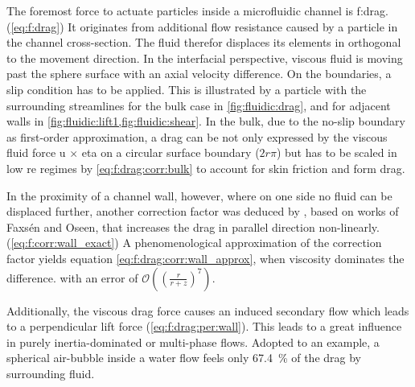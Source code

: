 The foremost force to actuate particles inside a microfluidic channel is \gls{f:drag}.(\cref{eq:f:drag}) It originates from additional flow resistance caused by a particle in the channel cross-section. The fluid therefor displaces its elements in orthogonal to the movement direction.\cite{lit:fluidic:motion_sphere_to_plane_surface}  In the interfacial perspective, viscous fluid is moving past the sphere surface with an axial velocity difference. On the boundaries, a slip condition has to be applied. This is illustrated by a particle with the surrounding streamlines for the bulk case in \cref{fig:fluidic:drag}, and for adjacent walls in \cref{fig:fluidic:lift1,fig:fluidic:shear}. In the bulk, due to the no-slip boundary as first-order approximation, a drag can be not only expressed by the viscous fluid force \gls{u} $\times$ \gls{eta} on a circular surface boundary ($2r\pi$) but has to be scaled in low \gls{re} regimes by \cref{eq:f:drag:corr:bulk} to account for skin friction and form drag.

In the proximity of a channel wall, however, where on one side no fluid can be displaced further, another correction factor was deduced by \citet{lit:fluid:Hydrodynamics}, based on works of Faxs\'{e}n and Oseen, that increases the drag in parallel direction non-linearly.(\cref{eq:f:corr:wall_exact}) A phenomenological approximation of the correction factor yields equation \cref{eq:f:drag:corr:wall_approx}, when viscosity dominates the difference. with an error of $\mathcal{O}\left((\frac{r}{r+z})^7\right)$.\cite{lit:fluid:velocities, lit:fluidic:motion_sphere_surface_2009} 

Additionally, the viscous drag force causes an induced secondary flow which leads to a perpendicular lift force (\cref{eq:f:drag:per:wall}).\cite{lit:fluid:Hydrodynamics,lit:fluidic:kim} This leads to a great influence in purely inertia-dominated or multi-phase flows.\cite{lit:fluid:deformabilityDiCarlo}  Adopted to an example, a spherical air-bubble inside a water flow feels only \SI{67.4}{\percent} of the drag by surrounding fluid.

